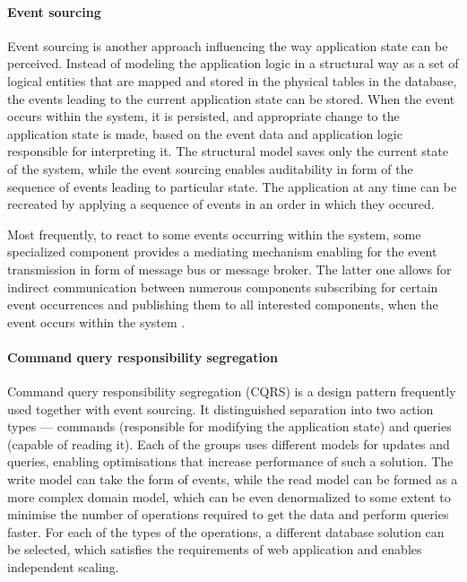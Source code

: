 \paragraph{Event sourcing}

Event sourcing is another approach influencing the way application state can be perceived. Instead of modeling the application logic in a structural way as a set of logical entities that are mapped and stored in the physical tables in the database, the events leading to the current application state can be stored. When the event occurs within the system, it is persisted, and appropriate change to the application state is made, based on the event data and application logic responsible for interpreting it. The structural model saves only the current state of the system, while the event sourcing enables auditability in form of the sequence of events leading to particular state. The application at any time can be recreated by applying a sequence of events in an order in which they occured.

Most frequently, to react to some events occurring within the system, some specialized component provides a mediating mechanism enabling for the event transmission in form of message bus or message broker. The latter one allows for indirect communication between numerous components subscribing for certain event occurrences and publishing them to all interested components, when the event occurs within the system \cite{MicroservicesArchitecture}.

\paragraph{Command query responsibility segregation}

Command query responsibility segregation (CQRS) is a design pattern frequently used together with event sourcing. It distinguished separation into two action types --- commands (responsible for modifying the application state) and queries (capable of reading it). Each of the groups uses different models for updates and queries, enabling optimisations that increase performance of such a solution. The write model can take the form of events, while the read model can be formed as a more complex domain model, which can be even denormalized to some extent to minimise the number of operations required to get the data and perform queries faster. For each of the types of the operations, a different database solution can be selected, which satisfies the requirements of web application and enables independent scaling. 

